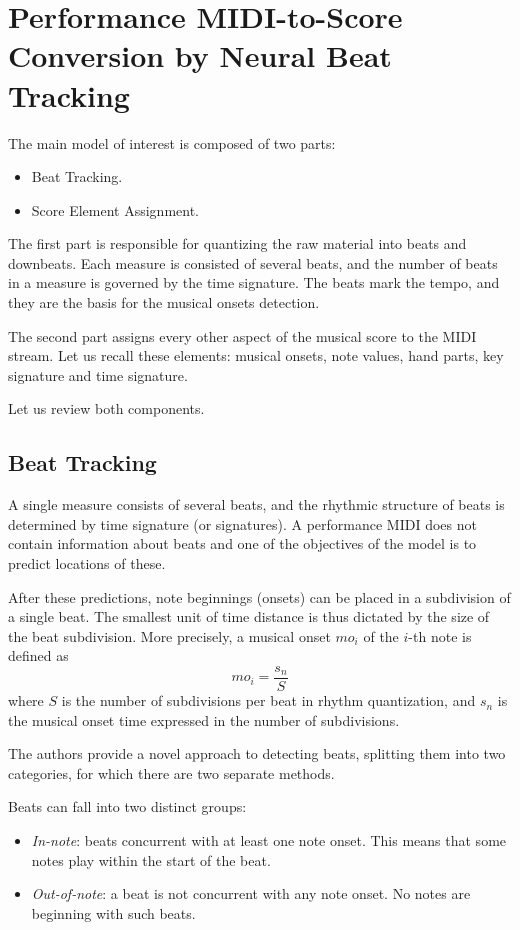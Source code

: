 \chapter{Performance MIDI-to-Score Conversion by Neural Beat Tracking}

The main model of interest \cite{Liu2022} is composed of two parts:
\begin{itemize}
	\item Beat Tracking.
	\item Score Element Assignment.
\end{itemize}

The first part is responsible for quantizing the raw material into beats and downbeats. Each measure is consisted of several beats, and the number of beats in a measure is governed by the time signature. The beats mark the tempo, and they are the basis for the musical onsets detection.

The second part assigns every other aspect of the musical score to the MIDI stream. Let us recall these elements: musical onsets, note values, hand parts, key signature and time signature.

Let us review both components.

\section{Beat Tracking}

A single measure consists of several beats, and the rhythmic structure of beats is determined by time signature (or signatures). A performance MIDI does not contain information about beats and one of the objectives of the model is to predict locations of these.

After these predictions, note beginnings (onsets) can be placed in a subdivision of a single beat. The smallest unit of time distance is thus dictated by the size of the beat subdivision. More precisely, a musical onset $mo_i$ of the $i$-th note is defined as \[mo_i = \frac{s_n}{S}\] where $S$ is the number of subdivisions per beat in rhythm quantization, and $s_n$ is the musical onset time expressed in the number of subdivisions.

The authors provide a novel approach to detecting beats, splitting them into two categories, for which there are two separate methods.

Beats can fall into two distinct groups:
\begin{itemize}
	\item \emph{In-note}: beats concurrent with at least one note onset. This means that some notes play within the start of the beat.
	\item \emph{Out-of-note}: a beat is not concurrent with any note onset. No notes are beginning with such beats.
\end{itemize}


